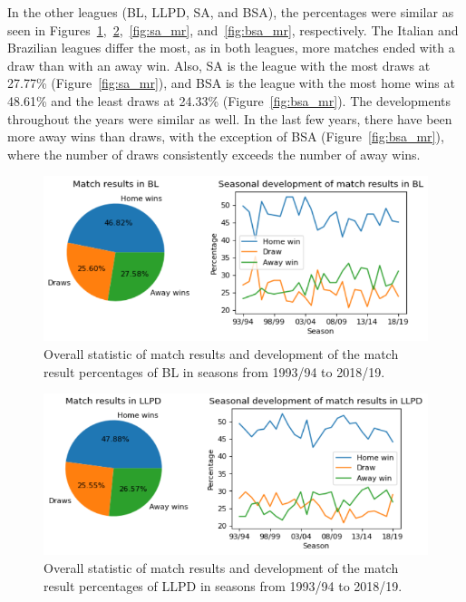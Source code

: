 \documentclass[thesis=M,english]{FITthesis}[2019/12/23]
\begin{document}
In the other leagues (BL, LLPD, SA, and BSA), the percentages were similar as seen in Figures~\ref{fig:bl_mr},~\ref{fig:llpd_mr},~\ref{fig:sa_mr}, and~\ref{fig:bsa_mr}, respectively. The Italian and Brazilian leagues differ the most, as in both leagues, more matches ended with a draw than with an away win. Also, SA is the league with the most draws at 27.77\% (Figure~\ref{fig:sa_mr}), and BSA is the league with the most home wins at 48.61\% and the least draws at 24.33\% (Figure~\ref{fig:bsa_mr}). The developments throughout the years were similar as well. In the last few years, there have been more away wins than draws, with the exception of BSA (Figure~\ref{fig:bsa_mr}), where the number of draws consistently exceeds the number of away wins.
\begin{figure}[h]
    \centering
    \includegraphics[width=1\textwidth]{figures/bl_subgraph.png}
    \caption{Overall statistic of match results and development of the match result percentages of BL in seasons from 1993/94 to 2018/19.}
    \label{fig:bl_mr}
\end{figure}
\begin{figure}[h]
    \centering
    \includegraphics[width=1\textwidth]{figures/llpd_subgraph.png}
    \caption{Overall statistic of match results and development of the match result percentages of LLPD in seasons from 1993/94 to 2018/19.}
    \label{fig:llpd_mr}
\end{figure}
\end{document}
